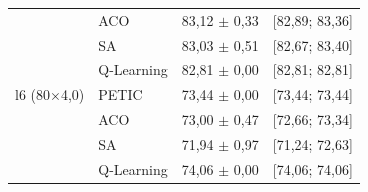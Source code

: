\begin{table}[htb]
\begin{tabular}{llcc}
         & ACO & 83,12 $\pm$ 0,33 & [82,89; 83,36] \\
         & SA & 83,03 $\pm$ 0,51 & [82,67; 83,40] \\
         & Q-Learning & 82,81 $\pm$ 0,00 & [82,81; 82,81] \\
        \hline
        l6 (80$\times$4,0) & PETIC & 73,44 $\pm$ 0,00 & [73,44; 73,44] \\
         & ACO & 73,00 $\pm$ 0,47 & [72,66; 73,34] \\
         & SA & 71,94 $\pm$ 0,97 & [71,24; 72,63] \\
         & Q-Learning & 74,06 $\pm$ 0,00 & [74,06; 74,06] \\
        \hline
    \end{tabular}
\end{table}
